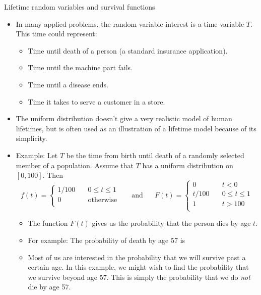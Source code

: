 \documentclass{article}
\begin{document}
Lifetime random variables and survival functions\bigskip
\begin{itemize}
    \item In many applied problems, the random variable interest is a time variable $T$. This time could represent:
    \begin{itemize}
        \item Time until death of a person (a standard insurance application).
        \item Time until the machine part fails.
        \item Time until a disease ends.
        \item Time it takes to serve a customer in a store.
    \end{itemize}
    \item The uniform distribution doesn't give a very realistic model of human lifetimes, but is often used as an illustration of a lifetime model because of its simplicity.
    \item Example: Let $T$ be the time from birth until death of a randomly selected member of a population. Assume that $T$ has a uniform distribution on $[0,100]$. Then
    \[
    f(t) =
        \left\{
        \begin{array}{ll}
            1/100 & \quad 0 \le t \le 1\\
            0 & \quad \text{otherwise}\\
        \end{array}
        \right.
    \hspace{20pt} \text{and} \hspace{20pt}
    F(t) =
        \left\{
        \begin{array}{ll}
            0 & \quad t <  0\\
            t/100 & \quad 0 \le t \le 1\\
            1 & \quad t > 100\\
        \end{array}
        \right.
    \]
    \begin{itemize}
        \item The function $F(t)$ gives us the probability that the person dies by age $t$.
        \item For example: The probability of death by age 57 is\bigskip
        \item Most of us are interested in the probability that we will survive past a certain age. In this example, we might wish to find the probability that we survive beyond age 57. This is simply the probability that we do \textit{not} die by age 57.\vspace{40pt}

\end{itemize}
\end{itemize}
\end{document}
